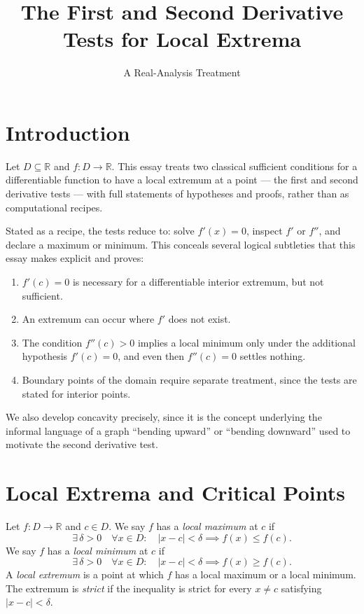 \documentclass{essay}
\title{The First and Second Derivative Tests for Local Extrema}
\subtitle{A Real-Analysis Treatment}
\author{}
\date{}
\begin{document}
\maketitle
\tableofcontents

\section{Introduction}

Let \(D\subseteq\mathbb{R}\) and \(f:D\to\mathbb{R}\). This essay treats two
classical sufficient conditions for a differentiable function to have a
local extremum at a point --- the first and second derivative tests --- with
full statements of hypotheses and proofs, rather than as computational
recipes.

Stated as a recipe, the tests reduce to: solve \(f'(x)=0\), inspect \(f'\) or
\(f''\), and declare a maximum or minimum. This conceals several logical
subtleties that this essay makes explicit and proves:

\begin{enumerate}
    \item \(f'(c)=0\) is necessary for a differentiable interior extremum,
    but not sufficient.
    \item An extremum can occur where \(f'\) does not exist.
    \item The condition \(f''(c)>0\) implies a local minimum only under the
    additional hypothesis \(f'(c)=0\), and even then \(f''(c)=0\) settles
    nothing.
    \item Boundary points of the domain require separate treatment, since
    the tests are stated for interior points.
\end{enumerate}

We also develop concavity precisely, since it is the concept underlying the
informal language of a graph ``bending upward'' or ``bending downward'' used
to motivate the second derivative test.

\section{Local Extrema and Critical Points}

\begin{definition}
Let \(f:D\to\mathbb{R}\) and \(c\in D\). We say \(f\) has a \emph{local
maximum} at \(c\) if
\[
\exists\,\delta>0 \quad \forall x\in D:\quad |x-c|<\delta \implies f(x)\leq f(c).
\]
We say \(f\) has a \emph{local minimum} at \(c\) if
\[
\exists\,\delta>0 \quad \forall x\in D:\quad |x-c|<\delta \implies f(x)\geq f(c).
\]
A \emph{local extremum} is a point at which \(f\) has a local maximum or a
local minimum. The extremum is \emph{strict} if the inequality is strict for
every \(x\neq c\) satisfying \(|x-c|<\delta\).
\end{definition}
\end{document}
